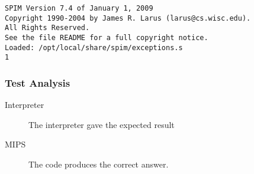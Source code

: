 \begin{verbatim}
SPIM Version 7.4 of January 1, 2009
Copyright 1990-2004 by James R. Larus (larus@cs.wisc.edu).
All Rights Reserved.
See the file README for a full copyright notice.
Loaded: /opt/local/share/spim/exceptions.s
1
\end{verbatim}
\subsubsection{Test Analysis}
\begin{description}
	\item[Interpreter] The interpreter gave the expected result
	\item[MIPS] The code produces the correct answer.
\end{description}

